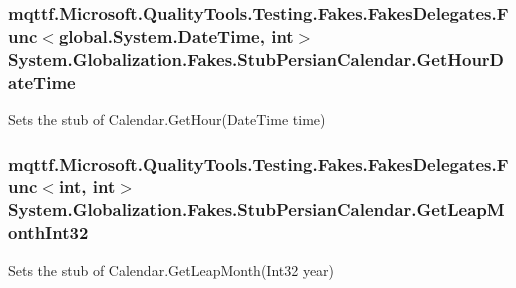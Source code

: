 \hypertarget{class_system_1_1_globalization_1_1_fakes_1_1_stub_persian_calendar_a1f534b1fb8bf58653b20bcb5110eddc7}{
\subsubsection[{Get\-Hour\-Date\-Time}]{\setlength{\rightskip}{0pt plus 5cm}mqttf.\-Microsoft.\-Quality\-Tools.\-Testing.\-Fakes.\-Fakes\-Delegates.\-Func$<$global.\-System.\-Date\-Time, int$>$ System.\-Globalization.\-Fakes.\-Stub\-Persian\-Calendar.\-Get\-Hour\-Date\-Time}}\label{class_system_1_1_globalization_1_1_fakes_1_1_stub_persian_calendar_a1f534b1fb8bf58653b20bcb5110eddc7}


Sets the stub of Calendar.\-Get\-Hour(\-Date\-Time time)

\hypertarget{class_system_1_1_globalization_1_1_fakes_1_1_stub_persian_calendar_ae1b209b0d993a353c199a534242e7268}{
\subsubsection[{Get\-Leap\-Month\-Int32}]{\setlength{\rightskip}{0pt plus 5cm}mqttf.\-Microsoft.\-Quality\-Tools.\-Testing.\-Fakes.\-Fakes\-Delegates.\-Func$<$int, int$>$ System.\-Globalization.\-Fakes.\-Stub\-Persian\-Calendar.\-Get\-Leap\-Month\-Int32}}\label{class_system_1_1_globalization_1_1_fakes_1_1_stub_persian_calendar_ae1b209b0d993a353c199a534242e7268}


Sets the stub of Calendar.\-Get\-Leap\-Month(\-Int32 year)

